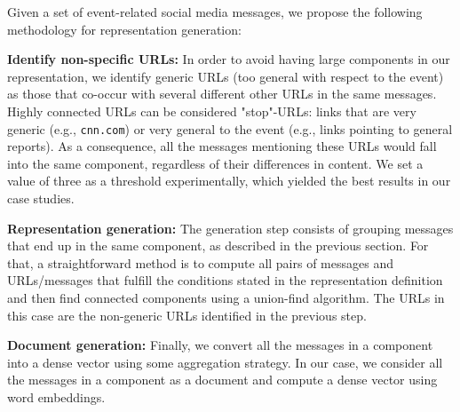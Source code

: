 Given a set of event-related social media messages, we propose the following
methodology for representation generation:
  
{\bf Identify non-specific URLs:} 
%
In order to avoid having large components in our representation, we identify
generic URLs (too general with respect to the event) as those that co-occur with
several different other URLs in the same messages. 
%
%
Highly connected URLs can be considered "stop"-URLs: links that are very generic
(e.g., {\tt cnn.com}) or very general to the event (e.g., links pointing to
general reports). 
%
As a consequence, all the messages mentioning these URLs would fall into the
same component, regardless of their differences in content. 
%
We set a value of three as a threshold experimentally, which yielded the best
results in our case studies.

{\bf Representation generation:} 
%
The generation step consists of grouping messages that end up in the same
component, as described in the previous section.
%
For that, a straightforward method is to compute all pairs of messages and
URLs/messages that fulfill the conditions stated in the representation
definition and then find connected components using a union-find algorithm.
%
The URLs in this case are the non-generic URLs identified in the previous step.


{\bf Document generation:} 
%
Finally, we convert all the messages in a component into a dense vector using
some aggregation strategy.
%
In our case, we consider all the messages in a component as a document and
compute a dense vector using word embeddings.







